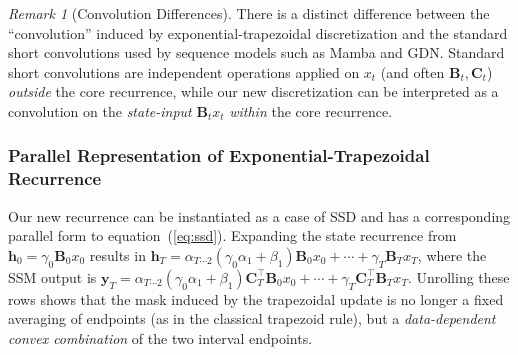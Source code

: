 \documentclass{article}
\def\eqref#1{equation~(\ref{#1})}
\def\vh{{\bm{h}}}
\def\vy{{\bm{y}}}
\def\bB{{\bm{B}}}
\def\bC{{\bm{C}}}
\theoremstyle{plain}
\theoremstyle{definition}
\theoremstyle{remark}
\newtheorem{remark}{Remark}
\begin{document}
\begin{remark} [Convolution Differences]
    There is a distinct difference between the ``convolution'' induced by exponential-trapezoidal discretization and the standard short convolutions used by sequence models such as Mamba and GDN.
    Standard short convolutions are independent operations applied on $x_t$ (and often $\bB_t, \bC_t$) \textit{outside} the core recurrence, while our new discretization can be interpreted as a convolution on the \emph{state-input} $\bB_t x_t$ \emph{within} the core recurrence.
\end{remark}

\subsubsection{Parallel Representation of Exponential-Trapezoidal Recurrence}
\label{sec:method:trap:ssd}

Our new recurrence can be instantiated as a case of SSD and has a corresponding parallel form to \eqref{eq:ssd}.
Expanding the state recurrence from $\vh_0 = \gamma_0 \bB_0 x_0$ results in $\vh_T = \alpha_{T\cdots 2}(\gamma_0\alpha_1 + \beta_1)\bB_0x_0 + \cdots + \gamma_T \bB_T x_T$, where the SSM output is $\vy_T = \alpha_{T\cdots 2}(\gamma_0\alpha_1 + \beta_1) \bC_T^\top \bB_0 x_0 + \cdots + \gamma_T \bC_T^\top \bB_T x_T$.
Unrolling these rows shows that the mask induced by the trapezoidal update is no longer a fixed averaging of endpoints (as in the classical trapezoid rule), but a \emph{data-dependent convex combination} of the two interval endpoints. 
\end{document}
